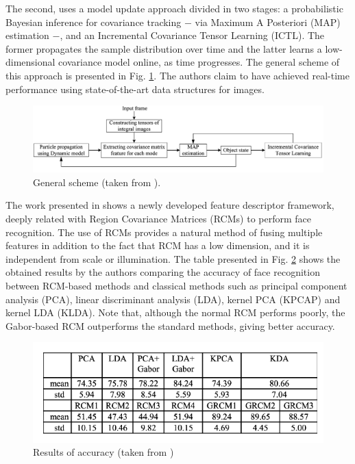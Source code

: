 \documentclass[11pt]{article}
\theoremstyle{definition}
\theoremstyle{remark}
\theoremstyle{remark}
\theoremstyle{remark}
\begin{document}
The second, uses a model update approach divided in two stages: a probabilistic Bayesian inference for covariance tracking $-$ via Maximum A Posteriori (MAP) estimation $-$, and an Incremental Covariance Tensor Learning (ICTL). The former propagates the sample distribution over time and the latter learns a low-dimensional covariance model online, as time progresses. The general scheme of this approach is presented in Fig. \ref{fig:scheme}. The authors claim to have achieved real-time performance using state-of-the-art data structures for images.

\begin{figure}[H]
    \centering
    \includegraphics[scale=0.21]{scheme.png}
    \caption{General scheme (taken from \parencite{wu2012real}).}
    \label{fig:scheme}
\end{figure}


The work presented in \cite{pang2008gabor} shows a newly developed feature descriptor framework, deeply related with Region Covariance Matrices (RCMs) to perform face recognition. The use of RCMs provides a natural method of fusing multiple features in addition to the fact that RCM has a low dimension, and it is independent from scale or illumination. The table presented in Fig. \ref{fig:accuracy} shows the obtained results by the authors comparing the accuracy of face recognition between RCM-based methods and classical methods such as principal component analysis (PCA), linear discriminant analysis (LDA), kernel PCA (KPCAP) and kernel LDA (KLDA). Note that, although the normal RCM performs poorly, the Gabor-based RCM outperforms the standard methods, giving better accuracy.

\begin{figure}[H]
    \centering
    \includegraphics[scale = 0.45]{accuracy_comparing.png}
    \caption{Results of accuracy (taken from \cite{pang2008gabor})}
    \label{fig:accuracy}
\end{figure}
\end{document}
